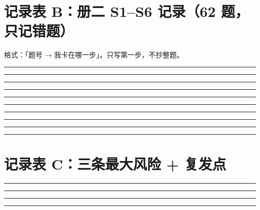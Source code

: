 \documentclass[10pt,a4paper]{ctexart}
\begin{document}
\section*{记录表 B：册二 S1--S6 记录（62 题，只记错题）}
{\small 格式：「题号 → 我卡在哪一步」。只写第一步，不抄整题。}
\par\smallskip\noindent\rule{\linewidth}{0.25pt}\par\vspace{0.56cm}
\noindent\rule{\linewidth}{0.25pt}\par\vspace{0.56cm}
\noindent\rule{\linewidth}{0.25pt}\par\vspace{0.56cm}
\noindent\rule{\linewidth}{0.25pt}\par\vspace{0.56cm}
\noindent\rule{\linewidth}{0.25pt}\par\vspace{0.56cm}
\noindent\rule{\linewidth}{0.25pt}\par\vspace{0.56cm}
\noindent\rule{\linewidth}{0.25pt}\par\vspace{0.56cm}
\noindent\rule{\linewidth}{0.25pt}\par\vspace{0.56cm}
\noindent\rule{\linewidth}{0.25pt}\par\vspace{0.56cm}
\noindent\rule{\linewidth}{0.25pt}\par\vspace{0.56cm}
\section*{记录表 C：三条最大风险 + 复发点}
\par\smallskip\noindent\rule{\linewidth}{0.25pt}\par\vspace{0.56cm}
\noindent\rule{\linewidth}{0.25pt}\par\vspace{0.56cm}
\noindent\rule{\linewidth}{0.25pt}\par\vspace{0.56cm}
\noindent\rule{\linewidth}{0.25pt}\par\vspace{0.56cm}

\clearpage
\end{document}
